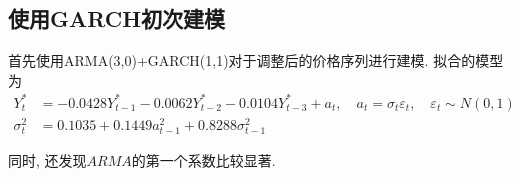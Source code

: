 \documentclass[11pt]{article}
\begin{document}
\subsection{使用GARCH初次建模}
\qquad 首先使用ARMA(3,0)+GARCH(1,1)对于调整后的价格序列进行建模. 拟合的模型为
\begin{equation*}\begin{aligned}
    Y_{t}^{*} &=-0.0428 Y_{t-1}^{*}-0.0062 Y_{t-2}^{*}-0.0104 Y_{t-3}^{*}+a_{t}, \quad a_{t}=\sigma_{t} \varepsilon_{t}, \quad \varepsilon_{t} \sim N(0,1) \\
    \sigma_{t}^{2} &=0.1035+ 0.1449 a_{t-1}^{2}+0.8288 \sigma_{t-1}^{2}
\end{aligned}\end{equation*}

同时, 还发现$ARMA$的第一个系数比较显著. 
\end{document}
